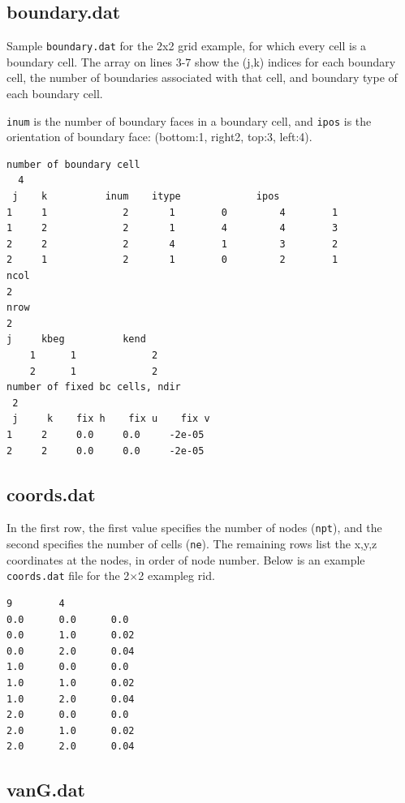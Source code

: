 \documentclass{article}
\newcommand{\code}[1]{\texttt{#1}}
\begin{document}
\subsection{boundary.dat}

Sample \code{boundary.dat} for the 2x2 grid example, for which every cell is a boundary cell. 
The array on lines 3-7 show the (j,k) indices for each boundary cell, the number of boundaries associated with that cell, and boundary type of each boundary cell.

\code{inum}  is the number of boundary faces in a boundary cell,
and   \code{ipos} is the orientation of boundary face: (bottom:1, right2, top:3, left:4).

\begin{verbatim}
number of boundary cell 
  4 
 j    k          inum    itype             ipos 
1     1             2       1        0         4        1      
1     2             2       1        4         4        3      
2     2             2       4        1         3        2      
2     1             2       1        0         2        1      
ncol
2
nrow
2
j     kbeg          kend 
    1      1             2   
    2      1             2   
number of fixed bc cells, ndir    
 2  
 j     k    fix h    fix u    fix v	
1     2     0.0     0.0     -2e-05     
2     2     0.0     0.0     -2e-05     
\end{verbatim}

\subsection{coords.dat}

In the first row, the first value specifies the number of nodes (\code{npt}), and the second specifies the number of cells (\code{ne}).  The remaining rows list the x,y,z coordinates at the nodes, in order of node number. Below is an example \code{coords.dat} file for the 2$\times$2 exampleg rid.


\begin{verbatim}
9        4            
0.0      0.0      0.0       
0.0      1.0      0.02
0.0      2.0      0.04
1.0      0.0      0.0       
1.0      1.0      0.02
1.0      2.0      0.04
2.0      0.0      0.0       
2.0      1.0      0.02
2.0      2.0      0.04
\end{verbatim}

\subsection{vanG.dat}
\end{document}
